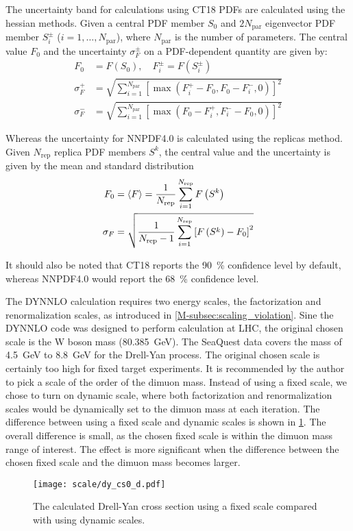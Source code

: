 \documentclass[../main.tex]{subfiles}
\begin{document}
The uncertainty band for calculations using CT18 PDFs are calculated using the hessian methods.
Given a central PDF member $S_0$ and $2N_{\mathrm{par}}$ eigenvector PDF member $S^\pm_i$ ($i=1,\dots,N_{\mathrm{par}}$),
where $N_{\mathrm{par}}$ is the number of parameters. The central value $F_0$ and the uncertainty $\sigma^\pm_F$
on a PDF-dependent quantity are given by:
\begin{equation}
	\begin{split}
		F_0 &= F(S_0),\quad F_i^\pm=F(S_i^\pm) \\
		\sigma^+_F &= \sqrt{\sum_{i=1}^{N_{\mathrm{par}}} \left[\max\left(F_i^+ - F_0, F_0 - F^-_i,0\right)\right]^2 }\\
		\sigma^-_F &= \sqrt{\sum_{i=1}^{N_{\mathrm{par}}} \left[\max\left(F_0 - F^+_i, F_i^- - F_0,0\right)\right]^2 }
	\end{split}
\end{equation}

Whereas the uncertainty for NNPDF4.0 is calculated using the replicas method. Given $N_{\mathrm{rep}}$ replica
PDF members $S^k$, the central value and the uncertainty is given by the mean and standard distribution
\begin{equation}
	\begin{split}
		F_0&=\expval{F}=\frac{1}{N_{\mathrm{rep}}}\sum_{i=1}^{N_{\mathrm{rep}}}F\left(S^k\right)\\
		\sigma_F&= \sqrt{\frac{1}{N_{\mathrm{rep}}-1}\sum_{i=1}^{N_{\mathrm{rep}}}\left[F\left(S^k\right)-F_0\right]^2}
	\end{split}
\end{equation}

It should also be noted that CT18 reports the \SI{90}{\percent} confidence level by default, whereas NNPDF4.0
would report the \SI{68}{\percent} confidence level.

The DYNNLO calculation requires two energy scales, the factorization and renormalization scales,
as introduced in \cref {M-subsec:scaling_violation}. Sine the DYNNLO code was designed to perform
calculation at LHC, the original chosen scale is the W boson mass (\SI{80.385}{\GeV}). 
The SeaQuest data covers the mass of \SI{4.5}{\GeV} to \SI{8.8}{\GeV} for the Drell-Yan
process. The original chosen scale is certainly too high for fixed target experiments. 
It is recommended by the author to pick a scale of the order of the dimuon mass. 
Instead of using a fixed scale, we chose to turn on dynamic scale,
where both factorization and renormalization scales would be dynamically set to the dimuon mass at
each iteration.  The difference between using a fixed scale and dynamic scales is shown in \cref{fig:DY_scale}.
The overall difference is small, as the chosen fixed scale is within the dimuon mass range of interest.
The effect is more significant when the difference between the chosen fixed scale and the dimuon mass
becomes larger.
\begin{figure}[h!]
	\centering
	\texttt{[image: scale/dy\_cs0\_d.pdf]}
	\caption{The calculated Drell-Yan cross section using a fixed scale compared with using dynamic scales.
	}
	\label{fig:DY_scale}
\end{figure}




\ifSubfilesClassLoaded{ \printbibliography[heading=bibintoc,title={References}]}{}
\end{document}
